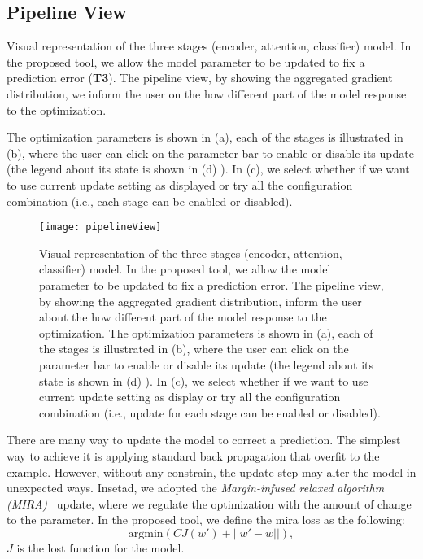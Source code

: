 \subsection{Pipeline View}
\label{sec:pipeline}
Visual representation of the three stages (encoder, attention, classifier) model. In the proposed tool, we allow the model parameter to be updated to fix a prediction error (\textbf{T3}). The pipeline view, by showing the aggregated gradient distribution, we inform the user on the how different part of the model response to the optimization.

The optimization parameters is shown in (a), each of the stages is illustrated in (b), where the user can click on the parameter bar to enable or disable its update (the legend about its state is shown in (d) ). In (c), we select whether if we want to use current update setting as displayed or try all the configuration combination (i.e., each stage can be enabled or disabled).

\begin{figure}[htbp]
\centering
\vspace{-2mm}
 \texttt{[image: pipelineView]}
 \caption{
Visual representation of the three stages (encoder, attention, classifier) model. In the proposed tool, we allow the model parameter to be updated to fix a prediction error. The pipeline view, by showing the aggregated gradient distribution, inform the user about the how different part of the model response to the optimization.
%
The optimization parameters is shown in (a), each of the stages is illustrated in (b), where the user can click on the parameter bar to enable or disable its update (the legend about its state is shown in (d) ). In (c), we select whether if we want to use current update setting as display or try all the configuration combination (i.e., update for each stage can be enabled or disabled).
 }
\label{fig:pipelineView}
\end{figure}

There are many way to update the model to correct a prediction. The simplest way to achieve it is applying standard back propagation that overfit to the example. However, without any constrain, the update step may alter the model in unexpected ways. 
Insetad, we adopted the \emph{Margin-infused relaxed algorithm (MIRA)}~\cite{CrammerSinger2003} update, where we regulate the optimization with the amount of change to the parameter. In the proposed tool, we define the mira loss as the following:
\begin{equation}
\mathrm{argmin}(  C J(w') + ||w' - w|| ),
\end{equation}
$J$ is the lost function for the model.
